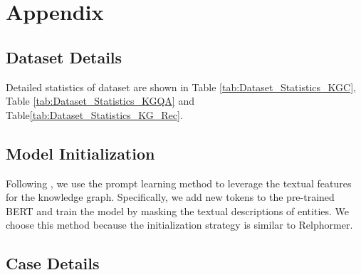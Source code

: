 \documentclass[sigconf]{acmart}
\newcommand{\bizhen}[1]{{\color{black}#1}}
\begin{document}



 
\iffalse
\appendix

\section{Appendix}
\subsection{Dataset Details}
\label{appendix:dataset_statictics}
Detailed statistics of dataset are shown in Table \ref{tab:Dataset_Statistics_KGC}, Table \ref{tab:Dataset_Statistics_KGQA} and Table\ref{tab:Dataset_Statistics_KG_Rec}.

\bizhen{
\subsection{Model Initialization}
Following \cite{PromptKG}, we use the prompt learning method to leverage the textual features for the knowledge graph.
Specifically, we add new tokens to the pre-trained BERT and train the model by masking the textual descriptions of entities.
We choose this method because the initialization strategy is similar to Relphormer.

}

\subsection{Case Details}
\end{document}
